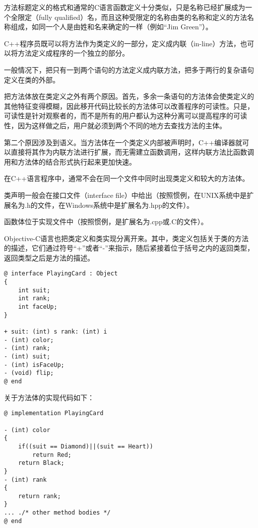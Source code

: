 方法标题定义的格式和通常的C语言函数定义十分类似，只是名称已经扩展成为一个全限定（fully qualified）名，而且这种受限定的名称由类的名称和定义的方法名称组成，如同一个人是由姓和名来确定的一样（例如“Jim Green”）。

C++程序员既可以将方法作为类定义的一部分，定义成内联（in-line）方法，也可以将方法定义成程序的一个独立的部分。

一般情况下，把只有一到两个语句的方法定义成内联方法，把多于两行的复杂语句定义在类的外部。



把方法体放在类定义之外有两个原因。首先，多余一条语句的方法体会使类定义的其他特征变得模糊，因此移开代码比较长的方法体可以改善程序的可读性。只是，可读性是针对观察者的，而不是所有的用户都认为这种分离可以提高程序的可读性，因为这样做之后，用户就必须到两个不同的地方去查找方法的主体。

第二个原因涉及到语义。当方法体在一个类定义内部被声明时，C++编译器就可以直接将其作为内联方法进行扩展，而无需建立函数调用，这样内联方法比函数调用和方法体的结合形式执行起来更加快速。


在C++语言程序中，通常不会在同一个文件中同时出现类定义和较大的方法体。

\begin{compactitem}
\item 类声明一般会在接口文件（interface file）中给出（按照惯例，在UNIX系统中是扩展名为.h的文件，在Windows系统中是扩展名为.hpp的文件）。
\item 函数体位于实现文件中（按照惯例，是扩展名为.cpp或.C的文件）。
\end{compactitem}

Objective-C语言也把类定义和类实现分离开来。其中，类定义包括关于类的方法的描述，它们通过符号“+”或者“-”来指示，随后紧接着位于括号之内的返回类型，返回类型之后是方法的描述。

\begin{lstlisting}[language={[Objective]C}]
@ interface PlayingCard : Object
{
	int suit;
	int rank;
	int faceUp;
}
	
+ suit: (int) s rank: (int) i
- (int) color;
- (int) rank;
- (int) suit;
- (int) isFaceUp;
- (void) flip;
@ end
\end{lstlisting}


关于方法体的实现代码如下：



\begin{lstlisting}[language={[Objective]C}]
@ implementation PlayingCard
	
- (int) color
{
	if((suit == Diamond)||(suit == Heart))
		return Red;
	return Black;
}
- (int) rank
{
	return rank;
}
... ./* other method bodies */
@ end
\end{lstlisting}



